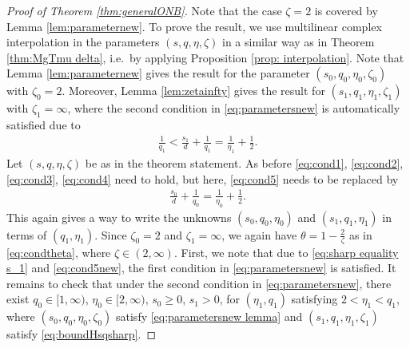 \documentclass[reqno]{amsart}
\theoremstyle{plain}
\theoremstyle{remark}
\theoremstyle{plain}
\numberwithin{equation}{section}
\newcommand{\1}{\one}
\begin{document}
\begin{proof}[Proof of Theorem \ref{thm:generalONB}]
Note that the case $\zeta = 2$ is covered by Lemma \ref{lem:parameternew}.
To prove the result, we use multilinear complex interpolation in the parameters $(s, q, \eta, \zeta)$ in a similar way as in Theorem \ref{thm:MgTmu delta}, i.e.\ by applying Proposition \ref{prop: interpolation}.
Note that Lemma \ref{lem:parameternew} gives the result for the parameter $(s_0, q_0, \eta_0, \zeta_0)$ with $\zeta_0 = 2$. Moreover, Lemma \ref{lem:zetainfty} gives the result for $(s_1, q_1, \eta_1, \zeta_1)$ with $\zeta_1=\infty$, where the second condition in \eqref{eq:parametersnew} is automatically satisfied due to
\begin{align}
\label{eq:sharp equality s_1}
    \frac{1}{q_1}<\frac{s_1}{d}+\frac{1}{q_1} = \frac{1}{\eta_1} + \frac{1}{2}.
\end{align}
Let $(s, q, \eta, \zeta)$ be as in the theorem statement. As before \eqref{eq:cond1}, \eqref{eq:cond2}, \eqref{eq:cond3}, \eqref{eq:cond4} need to hold, but here, \eqref{eq:cond5} needs to be replaced by 
\begin{align}
\label{eq:cond5new}
\frac{s_0}{d} + \frac{1}{q_0} = \frac{1}{\eta_0} +\frac12.
\end{align}
This again gives a way to write the unknowns $(s_0, q_0, \eta_0)$ and $(s_1, q_1, \eta_1)$ in terms of $(q_1, \eta_1)$.
Since $\zeta_0 = 2$ and $\zeta_1=\infty$, we again have $\theta = 1-\frac{2}{\zeta}$ as in \eqref{eq:condtheta}, where $\zeta\in (2, \infty)$. 
First, we note that due to \eqref{eq:sharp equality s_1} and \eqref{eq:cond5new}, the first condition in \eqref{eq:parametersnew} is satisfied.
It remains to check that under the second condition in \eqref{eq:parametersnew}, there exist $q_0\in [1, \infty)$, $\eta_0\in [2, \infty)$, $s_0\geq 0$, $s_1>0$, for  $(\eta_1, q_1)$ satisfying $2<\eta_1<q_1$, where $(s_0,q_0,\eta_0,\zeta_0)$ satisfy \eqref{eq:parametersnew lemma} and $(s_1,q_1,\eta_1,\zeta_1)$ satisfy \eqref{eq:boundHsqsharp}.


\end{proof}
\end{document}
